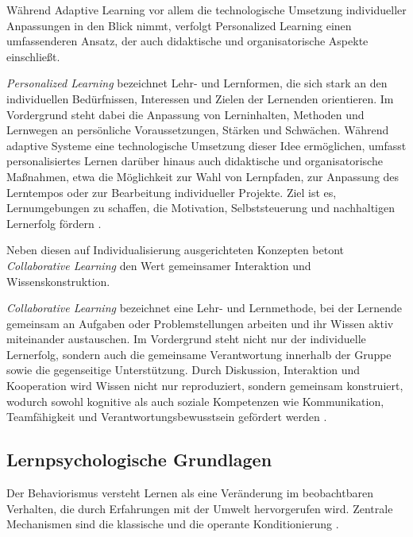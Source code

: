 Während Adaptive Learning vor allem die technologische Umsetzung individueller Anpassungen in den Blick nimmt, verfolgt Personalized Learning einen umfassenderen Ansatz, der auch didaktische und organisatorische Aspekte einschließt.

\textit{Personalized Learning} bezeichnet Lehr- und Lernformen, die sich stark an den individuellen Bedürfnissen, Interessen und Zielen der Lernenden orientieren. Im Vordergrund steht dabei die Anpassung von Lerninhalten, Methoden und Lernwegen an persönliche Voraussetzungen, Stärken und Schwächen. Während adaptive Systeme eine technologische Umsetzung dieser Idee ermöglichen, umfasst personalisiertes Lernen darüber hinaus auch didaktische und organisatorische Maßnahmen, etwa die Möglichkeit zur Wahl von Lernpfaden, zur Anpassung des Lerntempos oder zur Bearbeitung individueller Projekte. Ziel ist es, Lernumgebungen zu schaffen, die Motivation, Selbststeuerung und nachhaltigen Lernerfolg fördern \parencites[S.~6ff]{pane_informing_2017}[S.~2f]{gunawardena_personalized_2024}[S.~236--239]{walkington_appraising_2020}.

Neben diesen auf Individualisierung ausgerichteten Konzepten betont \textit{Collaborative Learning} den Wert gemeinsamer Interaktion und Wissenskonstruktion.

\textit{Collaborative Learning} bezeichnet eine Lehr- und Lernmethode, bei der Lernende gemeinsam an Aufgaben oder Problemstellungen arbeiten und ihr Wissen aktiv miteinander austauschen. Im Vordergrund steht nicht nur der individuelle Lernerfolg, sondern auch die gemeinsame Verantwortung innerhalb der Gruppe sowie die gegenseitige Unterstützung. Durch Diskussion, Interaktion und Kooperation wird Wissen nicht nur reproduziert, sondern gemeinsam konstruiert, wodurch sowohl kognitive als auch soziale Kompetenzen wie Kommunikation, Teamfähigkeit und Verantwortungsbewusstsein gefördert werden \parencite[S.~486]{laal_benefits_2021}.

\subsection{Lernpsychologische Grundlagen}

Der Behaviorismus versteht Lernen als eine Veränderung im beobachtbaren Verhalten, die durch Erfahrungen mit der Umwelt hervorgerufen wird. Zentrale Mechanismen sind die klassische und die operante Konditionierung \parencite[S.~15]{pfeiffer_simulationsumgebungen_2008}.

